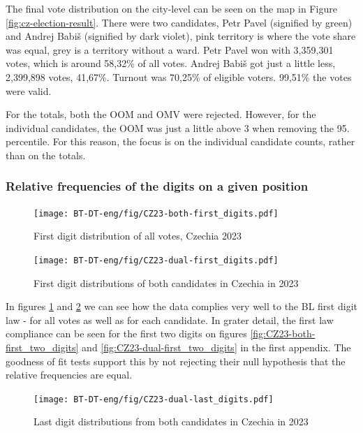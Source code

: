 The final vote distribution on the city-level can be seen on the map in Figure \ref{fig:cz-election-result}. There were two candidates, Petr Pavel (signified by green) and Andrej Babiš (signified by dark violet), pink territory is where the vote share was equal, grey is a territory without a ward. Petr Pavel won with 3,359,301 votes, which is around 58,32\% of all votes. Andrej Babiš got just a little less, 2,399,898 votes, 41,67\%. Turnout was 70,25\% of eligible voters. 99,51\% the votes were valid. \cite{CR23data}

For the totals, both the OOM and OMV were rejected. However, for the individual candidates, the OOM was just a little above 3 when removing the 95. percentile. For this reason, the focus is on the individual candidate counts, rather than on the totals. 


\subsubsection{Relative frequencies of the digits on a given position}

\begin{figure}[h]
    \centering
    \caption{First digit distribution of all votes, Czechia 2023}
    \texttt{[image: BT-DT-eng/fig/CZ23-both-first\_digits.pdf]}
    \label{fig:CZ23-both-first_digits}
\end{figure}

 
\begin{figure}[h]
    \centering
    \caption{First digit distributions of both candidates in Czechia in 2023}
    \texttt{[image: BT-DT-eng/fig/CZ23-dual-first\_digits.pdf]}
    \label{fig:CZ23-dual-first_digits}
\end{figure}

In figures \ref{fig:CZ23-both-first_digits} and \ref{fig:CZ23-dual-first_digits} we can see how the data complies very well to the BL first digit law - for all votes as well as for each candidate. In grater detail, the first law compliance can be seen for the first two digits on figures \ref{fig:CZ23-both-first_two_digits} and \ref{fig:CZ23-dual-first_two_digits} in the first appendix. The goodness of fit tests support this by not rejecting their null hypothesis that the relative frequencies are equal. 

\begin{figure}[h]
    \centering
    \caption{Last digit distributions from both candidates in Czechia in 2023}
    \texttt{[image: BT-DT-eng/fig/CZ23-dual-last\_digits.pdf]}
    \label{fig:CZ23-dual-last_digits}
\end{figure}

